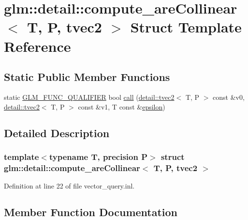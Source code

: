 \hypertarget{structglm_1_1detail_1_1compute__are_collinear_3_01_t_00_01_p_00_01tvec2_01_4}{}\section{glm\+:\+:detail\+:\+:compute\+\_\+are\+Collinear$<$ T, P, tvec2 $>$ Struct Template Reference}
\label{structglm_1_1detail_1_1compute__are_collinear_3_01_t_00_01_p_00_01tvec2_01_4}
\subsection*{Static Public Member Functions}
\begin{DoxyCompactItemize}
\item 
static \hyperlink{setup_8hpp_a33fdea6f91c5f834105f7415e2a64407}{G\+L\+M\+\_\+\+F\+U\+N\+C\+\_\+\+Q\+U\+A\+L\+I\+F\+I\+ER} bool \hyperlink{structglm_1_1detail_1_1compute__are_collinear_3_01_t_00_01_p_00_01tvec2_01_4_a2f040e5d783927c363a8c14c5cec65d8}{call} (\hyperlink{structglm_1_1detail_1_1tvec2}{detail\+::tvec2}$<$ T, P $>$ const \&v0, \hyperlink{structglm_1_1detail_1_1tvec2}{detail\+::tvec2}$<$ T, P $>$ const \&v1, T const \&\hyperlink{group__gtc__constants_gacb41049b8d22c8aa90e362b96c524feb}{epsilon})
\end{DoxyCompactItemize}


\subsection{Detailed Description}
\subsubsection*{template$<$typename T, precision P$>$\newline
struct glm\+::detail\+::compute\+\_\+are\+Collinear$<$ T, P, tvec2 $>$}



Definition at line 22 of file vector\+\_\+query.\+inl.



\subsection{Member Function Documentation}
\mbox{\label{structglm_1_1detail_1_1compute__are_collinear_3_01_t_00_01_p_00_01tvec2_01_4_a2f040e5d783927c363a8c14c5cec65d8}} 
